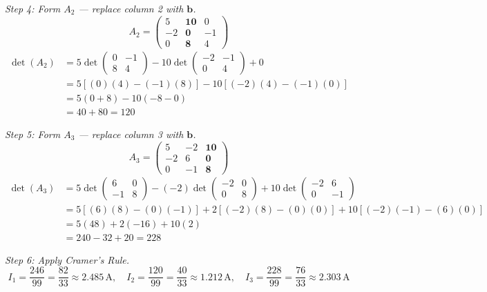 \documentclass[12pt,a4paper]{article}
\begin{document}
\textit{Step 4: Form \(A_2\) --- replace column 2 with \(\mathbf{b}\).}
\[
A_2 = \begin{pmatrix} 5 & \mathbf{10} & 0 \\ -2 & \mathbf{0} & -1 \\ 0 & \mathbf{8} & 4 \end{pmatrix}
\]
\begin{align*}
\det(A_2) &= 5\det\begin{pmatrix}0&-1\\8&4\end{pmatrix}
            - 10\det\begin{pmatrix}-2&-1\\0&4\end{pmatrix}
            + 0 \\
&= 5[(0)(4)-(-1)(8)] - 10[(-2)(4)-(-1)(0)] \\
&= 5(0+8) - 10(-8-0) \\
&= 40 + 80 = 120
\end{align*}

\textit{Step 5: Form \(A_3\) --- replace column 3 with \(\mathbf{b}\).}
\[
A_3 = \begin{pmatrix} 5 & -2 & \mathbf{10} \\ -2 & 6 & \mathbf{0} \\ 0 & -1 & \mathbf{8} \end{pmatrix}
\]
\begin{align*}
\det(A_3) &= 5\det\begin{pmatrix}6&0\\-1&8\end{pmatrix}
            - (-2)\det\begin{pmatrix}-2&0\\0&8\end{pmatrix}
            + 10\det\begin{pmatrix}-2&6\\0&-1\end{pmatrix} \\
&= 5[(6)(8)-(0)(-1)] + 2[(-2)(8)-(0)(0)] + 10[(-2)(-1)-(6)(0)] \\
&= 5(48) + 2(-16) + 10(2) \\
&= 240 - 32 + 20 = 228
\end{align*}

\textit{Step 6: Apply Cramer's Rule.}
\[
I_1 = \frac{246}{99} = \frac{82}{33} \approx 2.485\,\text{A}, \quad
I_2 = \frac{120}{99} = \frac{40}{33} \approx 1.212\,\text{A}, \quad
I_3 = \frac{228}{99} = \frac{76}{33} \approx 2.303\,\text{A}
\]
\end{document}
